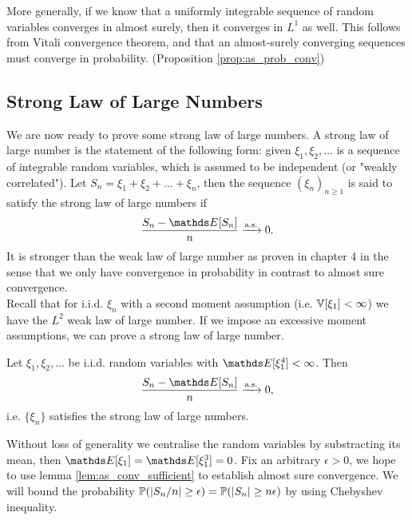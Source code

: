 \begin{unexaminable}
\begin{remark}
More generally, if we know that a uniformly integrable sequence of random variables converges in almost surely, then it converges in $L^1$ as well. This follows from Vitali convergence theorem, and that an almost-surely converging sequences must converge in probability. (Proposition \ref{prop:as_prob_conv})
\end{remark}
\end{unexaminable}

\subsection{Strong Law of Large Numbers}
We are now ready to prove some strong law of large numbers. A strong law of large number is the statement of the following form: given $\xi_1, \xi_2, \dots$ is a sequence of integrable random variables, which is assumed to be independent (or "weakly correlated"). Let $S_n = \xi_1 + \xi_2 + ... + \xi_n$, then the sequence $(\xi_n)_{n\geq 1}$ is said to satisfy the strong law of large numbers if 
\begin{equation*}
    \frac{S_n - \E[S_n]}{n} \xrightarrow{\text{a.s.}} 0.
\end{equation*}
It is stronger than the weak law of large number as proven in chapter 4 in the sense that we only have convergence in probability in contrast to almost sure convergence. \\

Recall that for i.i.d. $\xi_n$ with a second moment assumption (i.e. $\mathbb{V}[\xi_1] < \infty$) we have the $L^2$ weak law of large number. If we impose an excessive moment assumptions, we can prove a strong law of large number.

\begin{proposition}
Let $\xi_1, \xi_2, \dots$ be i.i.d. random variables with $\E[\xi_1^4] < \infty$. Then
\begin{equation}
    \frac{S_n - \E[S_n]}{n} \xrightarrow{\text{a.s.}} 0,
\end{equation}
i.e. $\{ \xi_n \}$ satisfies the strong law of large numbers.
\end{proposition}

\begin{hint}
Without loss of generality we centralise the random variables by substracting its mean, then $\E[\xi_1] = \E[\xi_1^3] = 0$. Fix an arbitrary $\epsilon > 0$, we hope to use lemma \ref{lem:as_conv_sufficient} to establish almost sure convergence. We will bound the probability $\mathbb{P}(|S_n/n| \geq \epsilon) = \mathbb{P}(|S_n| \geq n\epsilon)$ by using Chebyshev inequality.
\end{hint}

